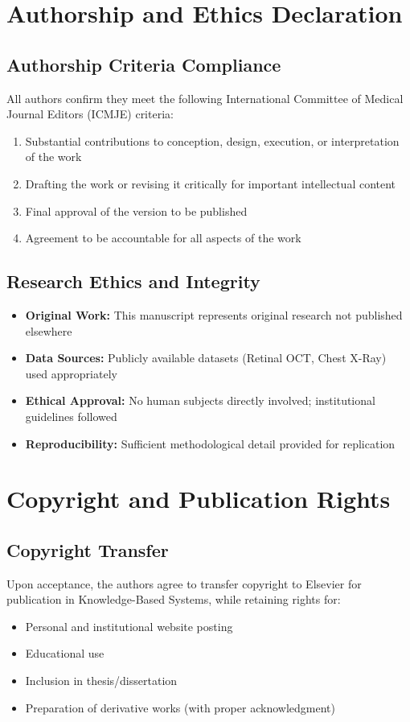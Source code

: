 \documentclass[12pt]{article}
\begin{document}
\section*{Authorship and Ethics Declaration}

\subsection*{Authorship Criteria Compliance}
All authors confirm they meet the following International Committee of Medical Journal Editors (ICMJE) criteria:
\begin{enumerate}
    \item Substantial contributions to conception, design, execution, or interpretation of the work
    \item Drafting the work or revising it critically for important intellectual content
    \item Final approval of the version to be published
    \item Agreement to be accountable for all aspects of the work
\end{enumerate}

\subsection*{Research Ethics and Integrity}
\begin{itemize}
    \item \textbf{Original Work:} This manuscript represents original research not published elsewhere
    \item \textbf{Data Sources:} Publicly available datasets (Retinal OCT, Chest X-Ray) used appropriately
    \item \textbf{Ethical Approval:} No human subjects directly involved; institutional guidelines followed
    \item \textbf{Reproducibility:} Sufficient methodological detail provided for replication
\end{itemize}

\section*{Copyright and Publication Rights}

\subsection*{Copyright Transfer}
Upon acceptance, the authors agree to transfer copyright to Elsevier for publication in Knowledge-Based Systems, while retaining rights for:
\begin{itemize}
    \item Personal and institutional website posting
    \item Educational use
    \item Inclusion in thesis/dissertation
    \item Preparation of derivative works (with proper acknowledgment)
\end{itemize}
\end{document}

